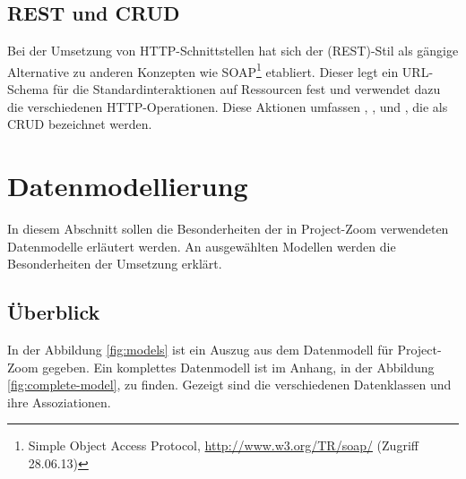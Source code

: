 \subsection{REST und CRUD}

Bei der Umsetzung von HTTP-Schnittstellen hat sich der  (REST)-Stil als gängige Alternative zu anderen Konzepten wie SOAP\footnote{Simple Object Access Protocol, \url{http://www.w3.org/TR/soap/} (Zugriff 28.06.13)} etabliert. Dieser legt ein URL-Schema für die Standardinteraktionen auf Ressourcen fest und verwendet dazu die verschiedenen HTTP-Operationen. Diese Aktionen umfassen , ,  und , die als CRUD bezeichnet werden.


\section{Datenmodellierung}
\label{sec:model}
In diesem Abschnitt sollen die Besonderheiten der in Project-Zoom verwendeten Datenmodelle erläutert werden. An ausgewählten Modellen werden die Besonderheiten der Umsetzung erklärt.

\subsection{Überblick}

In der Abbildung \ref{fig:models} ist ein Auszug aus dem Datenmodell für Project-Zoom gegeben. Ein komplettes Datenmodell ist im Anhang, in der Abbildung \ref{fig:complete-model}, zu finden. Gezeigt sind die verschiedenen Datenklassen und ihre Assoziationen. 

